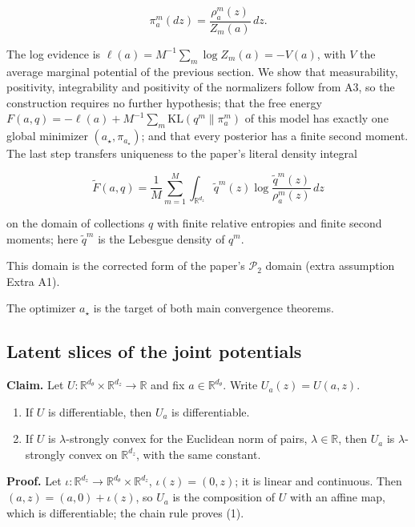 \documentclass[11pt,a4paper]{report}
\begin{document}
\[\pi_a^m(dz)=\frac{\rho_a^m(z)}{Z_m(a)}\,dz.\]


The log evidence is \(\ell(a)=M^{-1}\sum_m\log Z_m(a)=-V(a)\), with \(V\) the average marginal potential of the previous section. We show that measurability, positivity, integrability and positivity of the normalizers follow from A3, so the construction requires no further hypothesis; that the free energy \(F(a,q)=-\ell(a)+M^{-1}\sum_m\mathrm{KL}(q^m\|\pi_a^m)\) of this model has exactly one global minimizer \((a_\star,\pi_{a_\star})\); and that every posterior has a finite second moment. The last step transfers uniqueness to the paper's literal density integral


\[\widetilde F(a,q)=\frac1M\sum_{m=1}^M\int_{\mathbb R^{d_z}}\tilde q^m(z)\log\frac{\tilde q^m(z)}{\rho_a^m(z)}\,dz\]


on the domain of collections \(q\) with finite relative entropies and finite second moments; here \(\tilde q^m\) is the Lebesgue density of \(q^m\).




This domain is the corrected form of the paper's \(\mathcal P_2\) domain (extra assumption Extra A1).




The optimizer \(a_\star\) is the target of both main convergence theorems.

\subsection{\texorpdfstring{Latent slices of the joint potentials}{Latent slices of the joint potentials}}


\textbf{Claim.} Let \(U:\mathbb R^{d_\theta}\times\mathbb R^{d_z}\to\mathbb R\) and fix \(a\in\mathbb R^{d_\theta}\). Write \(U_a(z)=U(a,z)\).



\begin{enumerate}


\item If \(U\) is differentiable, then \(U_a\) is differentiable.

\item If \(U\) is \(\lambda\)-strongly convex for the Euclidean norm of pairs, \(\lambda\in\mathbb R\), then \(U_a\) is \(\lambda\)-strongly convex on \(\mathbb R^{d_z}\), with the same constant.

\end{enumerate}



\textbf{Proof.} Let \(\iota:\mathbb R^{d_z}\to\mathbb R^{d_\theta}\times\mathbb R^{d_z}\), \(\iota(z)=(0,z)\); it is linear and continuous. Then \((a,z)=(a,0)+\iota(z)\), so \(U_a\) is the composition of \(U\) with an affine map, which is differentiable; the chain rule proves (1).
\end{document}
